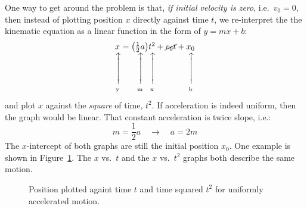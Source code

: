 \documentclass[11pt]{article}
\makeatletter
\newcommand\vertarrowbox[2]{%
    \begin{array}[t]{@{}c@{}} #1 \\
    \rotatebox{90}{$\xrightarrow{\hphantom{abcdefgh}}$} \\[-1ex]
    \mathclap{\scriptstyle\text{#2}}%
    \end{array}}
\makeatother
\begin{document}
One way to get around the problem is that, \emph{if initial velocity is zero},
i.e.\ $v_0=0$, then instead of plotting position $x$ directly against time $t$,
we re-interpret the the kinematic equation as a linear function in the form
of $y=mx+b$:
\begin{equation}
  \vertarrowbox{x}{y}=\vertarrowbox{\left(\frac12 a\right)}{m}
  \vertarrowbox{t^2}{x}+
  \cancel{v_0t}+
  \vertarrowbox{x_0}{b}
\end{equation}
and plot $x$ against the \emph{square} of time, $t^2$. If acceleration is
indeed uniform, then the graph would be linear. That constant acceleration is
twice slope, i.e.:
\begin{equation*}
  m=\frac12 a\quad\rightarrow\quad a=2m
\end{equation*}
The $x$-intercept of both graphs are still the initial position $x_0$. One
example is shown in Figure~\ref{switch1}. The $x$ vs.\ $t$ and the $x$ vs.\
$t^2$ graphs both describe the same motion.
\begin{figure}[!ht]
  \centering
  \hspace{.15in}
  \caption{Position plotted againt time $t$ and time squared $t^2$ for
    uniformly accelerated motion.}
  \label{switch1}
\end{figure} 
\end{document}
